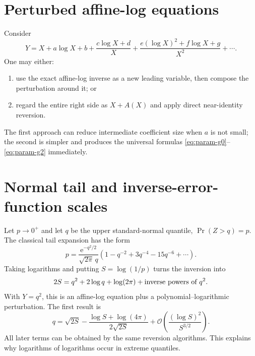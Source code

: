 \documentclass[11pt,oneside]{book}
\theoremstyle{definition}
\theoremstyle{remark}
\newcommand{\e}{\mathrm e}
\newcommand{\bigO}{\mathcal O}
\begin{document}
\section{Perturbed affine-log equations}
Consider
\begin{equation}\label{eq:perturbed-affine-log}
 Y=X+a\log X+b+\frac{c\log X+d}{X}
 +\frac{e(\log X)^2+f\log X+g}{X^2}+\cdots.
\end{equation}
One may either:
\begin{enumerate}
\item use the exact affine-log inverse as a new leading variable, then compose
      the perturbation around it; or
\item regard the entire right side as $X+A(X)$ and apply direct near-identity
      reversion.
\end{enumerate}
The first approach can reduce intermediate coefficient size when $a$ is not
small; the second is simpler and produces the universal formulas
\eqref{eq:param-g0}--\eqref{eq:param-g2} immediately.

\section{Normal tail and inverse-error-function scales}
Let $p\to0^+$ and let $q$ be the upper standard-normal quantile,
$\Pr(Z>q)=p$.  The classical tail expansion has the form
\[
 p=\frac{\e^{-q^2/2}}{\sqrt{2\pi}\,q}
 \left(1-q^{-2}+3q^{-4}-15q^{-6}+\cdots\right).
\]
Taking logarithms and putting $S=\log(1/p)$ turns the inversion into
\[
 2S=q^2+2\log q+\log(2\pi)+\hbox{inverse powers of }q^2.
\]
With $Y=q^2$, this is an affine-log equation plus a
polynomial--logarithmic perturbation.  The first result is
\begin{equation}\label{eq:normal-quantile-first}
 q=\sqrt{2S}
 -\frac{\log S+\log(4\pi)}{2\sqrt{2S}}
 +\bigO\!\left(\frac{(\log S)^2}{S^{3/2}}\right).
\end{equation}
All later terms can be obtained by the same reversion algorithms.  This
explains why logarithms of logarithms occur in extreme quantiles.
\end{document}

